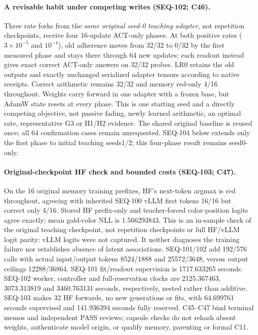 \documentclass{article}
\begin{document}
\paragraph{A revisable habit under competing writes (SEQ-102; C46).} Three rate forks from the \emph{same original seed-0 teaching adapter}, not repetition checkpoints, receive four 16-update ACT-only phases. At both positive rates ($3\!\times\!10^{-5}$ and $10^{-4}$), old adherence moves from 32/32 to 0/32 by the first measured phase and stays there through 64 new updates; each readout instead gives exact correct ACT-only answers on 32/32 probes. LR0 retains the old outputs and exactly unchanged serialized adapter tensors according to native receipts. Correct arithmetic remains 32/32 and memory red-only 4/16 throughout. Weights carry forward in one adapter with a frozen base, but AdamW state resets at every phase. This is one starting seed and a directly competing objective, not passive fading, newly learned arithmetic, an optimal rate, representative G3 or H1/H2 evidence. The shared original baseline is reused once; all 64 confirmation cases remain unrequested. SEQ-104 below extends only the first phase to initial teaching seeds1/2; this four-phase result remains seed0-only.

\paragraph{Original-checkpoint HF check and bounded costs (SEQ-103; C47).} On the 16 original memory training prefixes, HF's next-token argmax is red throughout, agreeing with inherited SEQ-100 vLLM first tokens 16/16 but correct only 4/16. Stored HF prefix-only and teacher-forced color-position logits agree exactly; mean gold-color NLL is 1.566293843. This is an in-sample check of the original teaching checkpoint, not repetition checkpoints or full HF/vLLM logit parity: vLLM logits were not captured. It neither diagnoses the training failure nor establishes absence of latent associations. SEQ-101/102 add 192/576 calls with actual input/output tokens 8524/1888 and 25572/3648, versus output ceilings 12288/36864. SEQ-101 fit/readout supervision is 1717.633265 seconds. SEQ-102 worker, controller and full-reservation clocks are 2125.367463, 3073.313819 and 3460.763131 seconds, respectively, nested rather than additive. SEQ-103 makes 32 HF forwards, no new generations or fits, with 64.699761 seconds supervised and 141.936394 seconds fully reserved. C45--C47 bind terminal memos and independent PASS reviews; capsule checks do not rehash absent weights, authenticate model origin, or qualify memory, parenting or formal C11.
\end{document}
